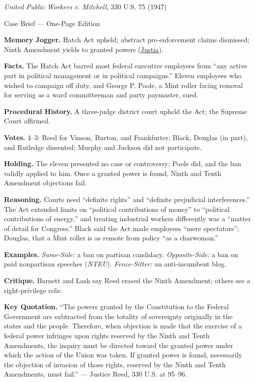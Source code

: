 \documentclass[12pt]{article}
\begin{document}
\begin{center}
{\Large \textit{United Public Workers v. Mitchell}, 330 U.S. 75 (1947)\par}
\vspace{0.3em}
{\normalsize Case Brief --- One-Page Edition\par}
\end{center}

\textbf{Memory Jogger.} Hatch Act upheld; abstract pre-enforcement claims dismissed; Ninth Amendment yields to granted powers (\href{https://supreme.justia.com/cases/federal/us/330/75/}{Justia}).

\textbf{Facts.} The Hatch Act barred most federal executive employees from ``any active part in political management or in political campaigns.'' Eleven employees who wished to campaign off duty, and George P. Poole, a Mint roller facing removal for serving as a ward committeeman and party paymaster, sued.

\textbf{Procedural History.} A three-judge district court upheld the Act; the Supreme Court affirmed.

\textbf{Votes.} 4--3: Reed for Vinson, Burton, and Frankfurter; Black, Douglas (in part), and Rutledge dissented; Murphy and Jackson did not participate.

\textbf{Holding.} The eleven presented no case or controversy; Poole did, and the ban validly applied to him. Once a granted power is found, Ninth and Tenth Amendment objections fail.

\textbf{Reasoning.} Courts need ``definite rights'' and ``definite prejudicial interferences.'' The Act extended limits on ``political contributions of money'' to ``political contributions of energy,'' and treating industrial workers differently was a ``matter of detail for Congress.'' Black said the Act made employees ``mere spectators''; Douglas, that a Mint roller is as remote from policy ``as a charwoman.''

\textbf{Examples.} \emph{Same-Side:} a ban on partisan candidacy. \emph{Opposite-Side:} a ban on paid nonpartisan speeches (\textit{NTEU}). \emph{Fence-Sitter:} an anti-incumbent blog.

\textbf{Critique.} Barnett and Lash say Reed erased the Ninth Amendment; others see a right-privilege relic.

\textbf{Key Quotation.} ``The powers granted by the Constitution to the Federal Government are subtracted from the totality of sovereignty originally in the states and the people. Therefore, when objection is made that the exercise of a federal power infringes upon rights reserved by the Ninth and Tenth Amendments, the inquiry must be directed toward the granted power under which the action of the Union was taken. If granted power is found, necessarily the objection of invasion of those rights, reserved by the Ninth and Tenth Amendments, must fail.'' --- Justice Reed, 330 U.S. at 95--96.
\end{document}
